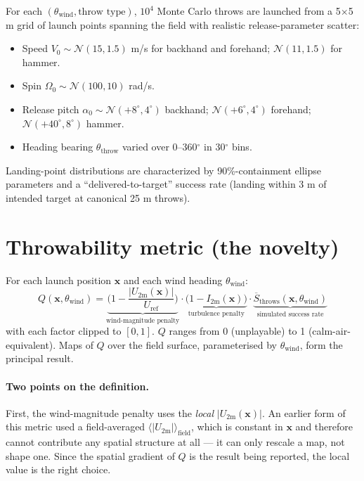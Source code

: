 \documentclass[11pt,letterpaper]{article}
\begin{document}
For each $(\theta_{\text{wind}}, \text{throw type})$, $10^4$ Monte Carlo throws are launched from a 5$\times$5 m grid of launch points spanning the field with realistic release-parameter scatter:
\begin{itemize}[leftmargin=*,itemsep=1pt]
  \item Speed $V_0 \sim \mathcal{N}(15, 1.5)$ m/s for backhand and forehand; $\mathcal{N}(11, 1.5)$ for hammer.
  \item Spin $\Omega_0 \sim \mathcal{N}(100, 10)$ rad/s.
  \item Release pitch $\alpha_0 \sim \mathcal{N}(+8^\circ, 4^\circ)$ backhand; $\mathcal{N}(+6^\circ, 4^\circ)$ forehand; $\mathcal{N}(+40^\circ, 8^\circ)$ hammer.
  \item Heading bearing $\theta_{\text{throw}}$ varied over 0--360$^\circ$ in 30$^\circ$ bins.
\end{itemize}
Landing-point distributions are characterized by 90\%-containment ellipse parameters and a ``delivered-to-target'' success rate (landing within 3 m of intended target at canonical 25 m throws).

\section{Throwability metric (the novelty)}
\label{sec:throwability}

For each launch position $\mathbf{x}$ and each wind heading $\theta_{\text{wind}}$:
\begin{equation}
Q(\mathbf{x}, \theta_{\text{wind}}) =
\underbrace{\Big(1 - \frac{|U_{2\text{m}}(\mathbf{x})|}{U_{\text{ref}}}\Big)}_{\text{wind-magnitude penalty}}
\cdot
\underbrace{\big(1 - I_{2\text{m}}(\mathbf{x})\big)}_{\text{turbulence penalty}}
\cdot
\underbrace{\overline{S}_{\text{throws}}(\mathbf{x}, \theta_{\text{wind}})}_{\text{simulated success rate}}
\label{eq:Q}
\end{equation}
with each factor clipped to $[0, 1]$. $Q$ ranges from 0 (unplayable) to 1
(calm-air-equivalent). Maps of $Q$ over the field surface, parameterised by
$\theta_{\text{wind}}$, form the principal result.

\paragraph{Two points on the definition.} First, the wind-magnitude penalty uses
the \emph{local} $|U_{2\text{m}}(\mathbf{x})|$. An earlier form of this metric
used a field-averaged $\langle |U_{2\text{m}}|\rangle_{\text{field}}$, which is
constant in $\mathbf{x}$ and therefore cannot contribute any spatial structure
at all --- it can only rescale a map, not shape one. Since the spatial gradient
of $Q$ is the result being reported, the local value is the right choice.
\end{document}
